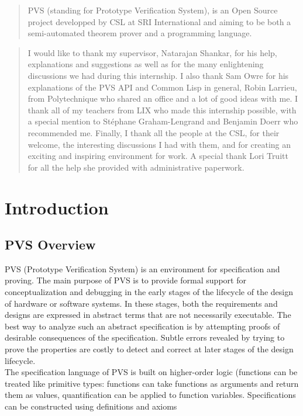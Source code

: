 \documentclass[12pt,a4paper]{article}
\begin{document}



\vspace{2.2in}
\begin{abstract}
PVS (standing for Prototype Verification System), is an Open Source project developped by CSL at SRI International and aiming to be both a semi-automated theorem prover and a programming language.
\end{abstract}

\renewcommand{\abstractname}{Acknowledgements}
\begin{abstract}
I would like to thank my supervisor, Natarajan Shankar, for his help, explanations and suggestions as well as for the many enlightening discussions we had during this internship. I also thank Sam Owre for his explanations of the PVS API and Common Lisp in general, Robin Larrieu, from Polytechnique who shared an office and a lot of good ideas with me. I thank all of my teachers from  LIX who made this internship possible, with a special mention to Stéphane Graham-Lengrand and Benjamin Doerr who recommended me.
Finally, I thank all the people at the CSL, for their welcome, the interesting discussions I had with them, and for creating an exciting and inspiring environment for work. 
A special thank Lori Truitt for all the help she provided with administrative paperwork.
\end{abstract}


\newpage
\tableofcontents
\newpage

\section{Introduction}


\subsection{PVS Overview}

PVS  (Prototype Verification System) is an environment for specification and proving. The main purpose of PVS is to provide 
formal support for conceptualization and debugging in the early stages of the lifecycle of the design
of hardware or software systems. In these stages, both the requirements and designs are expressed in abstract
terms that are not necessarily executable. The best way to analyze such an abstract specification is by 
attempting proofs of desirable consequences of the specification. Subtle errors revealed by trying to prove
the properties are costly to detect and correct at later stages of the design lifecycle.
\\The specification language of PVS is built on higher-order logic (functions can be treated like
primitive types: functions can take functions as arguments and return them as values, quantification
can be applied to function variables. Specifications can be constructed using definitions and axioms
\end{document}
